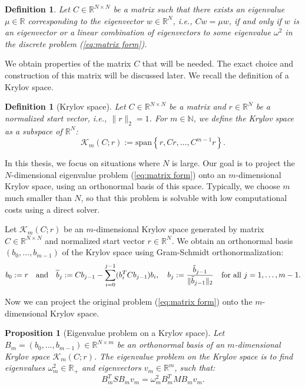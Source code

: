 \documentclass[a4paper,11pt,bibliography=totoc,listof=totoc,headinclude=true,cleardoublepage=empty,oneside]{scrbook}
\newtheorem{definition}[theorem]{Definition}
\newtheorem{prop}[theorem]{Proposition}
\newcommand{\R}{\mathbb{R}}
\newcommand{\N}{\mathbb{N}}
\renewcommand{\eqref}[1]{(\ref{#1})}
\begin{document}
\begin{definition}\label{def:C}
    Let $C \in \R^{N\times N}$ be a matrix such that there exists an eigenvalue $\mu \in \R$ corresponding to the eigenvector $w\in \R^N$, i.e., $Cw = \mu w$, if and only if $w$ is an eigenvector or a linear combination of eigenvectors to some eigenvalue $\omega^2$ in the discrete problem \eqref{eq:matrix form}.
\end{definition}

We obtain properties of the matrix $C$ that will be needed. The exact choice and construction of this matrix will be discussed later. We recall the definition of a Krylov space.

\begin{definition}[Krylov space]
    Let $C \in \R^{N \times N}$ be a matrix and $r\in \R^N$ be a normalized start vector, i.e., $\|r\|_2=1$. For $m\in \N$, we define the Krylov space as a subspace of $\R^N$:
    \begin{equation*}
        \mathcal{K}_m(C; r) := \mathrm{span}\left\{r, Cr, \dots, C^{m-1}r\right\}.
    \end{equation*}
\end{definition}

In this thesis, we focus on situations where $N$ is large. Our goal is to project the $N$-dimensional eigenvalue problem \eqref{eq:matrix form} onto an $m$-dimensional Krylov space, using an orthonormal basis of this space. Typically, we choose $m$ much smaller than $N$, so that this problem is solvable with low computational costs using a direct solver.

Let $\mathcal{K}_m(C; r)$ be an $m$-dimensional Krylov space generated by matrix $C\in \R^{N\times N}$ and normalized start vector $r\in \R^N$. We obtain an orthonormal basis $(b_0, \dots, b_{m-1})$ of the Krylov space using Gram-Schmidt orthonormalization:
\begin{equation*}
    b_0 := r \quad \text{and} \quad \widetilde{b}_{j} := Cb_{j-1} - \sum_{i=0}^{j-1} (b_i^T C b_{j-1}) b_i, \quad b_j := \frac{\Tilde{b}_{j-1}}{\|\Tilde{b}_{j-1}\|_2} \quad \text{for all } j=1, \dots, m-1. 
\end{equation*}


Now we can project the original problem \eqref{eq:matrix form} onto the $m$-dimensional Krylov space.

\begin{prop}[Eigenvalue problem on a Krylov space]
    Let $B_m = (b_0, \dots, b_{m-1}) \in \R^{N\times m}$ be an orthonormal basis of an $m$-dimensional Krylov space $\mathcal{K}_m(C; r)$. The eigenvalue problem on the Krylov space is to find eigenvalues $\omega_m^2 \in \R_+$ and eigenvectors $v_m\in\R^m$, such that:
    \begin{equation}\label{eq:Krylov problem}
        B_m^T S B_m v_m = \omega_m^2 B_m^T M B_m v_m.
    \end{equation}
\end{prop}
\end{document}
